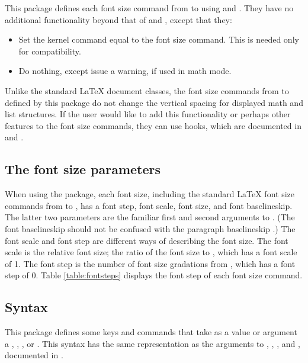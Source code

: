 \documentclass{beery}
\begin{document}
\listheading
  {
    This package defines each font size command from  to  using  and .
    They have no additional functionality beyond that of  and , except that they:
  }
\begin{itemize}
  \item
  Set the kernel command  equal to the font size command.
  This is needed only for compatibility.
  \item
  Do nothing, except issue a warning, if used in math mode.
\end{itemize}

Unlike the standard \LaTeX{} document classes, the font size commands from  to  defined by this package do not change the vertical spacing for displayed math and list structures.
If the user would like to add this functionality or perhaps other features to the font size commands, they can use hooks, which are documented in  and .

\subsection{The font size parameters}
\label{subsec:fontsizeparameters}

When using the  package, each font size, including the standard \LaTeX{} font size commands from  to , has a font step, font scale, font size, and font baselineskip.
The latter two parameters are the familiar first and second arguments to .
(The font baselineskip should not be confused with the paragraph baselineskip .)
The font scale and font step are different ways of describing the font size.
The font scale is the relative font size; the ratio of the font size to , which has a font scale of \num{1}.
The font step is the number of font size gradations from , which has a font step of \num{0}.
Table \ref{table:fontsteps} displays the font step of each font size command.



\subsection{Syntax}
\label{subsec:syntax}

This package defines some keys and commands that take as a value or argument a , , , or .
This syntax has the same representation as the arguments to , , , and , documented in .
\end{document}
